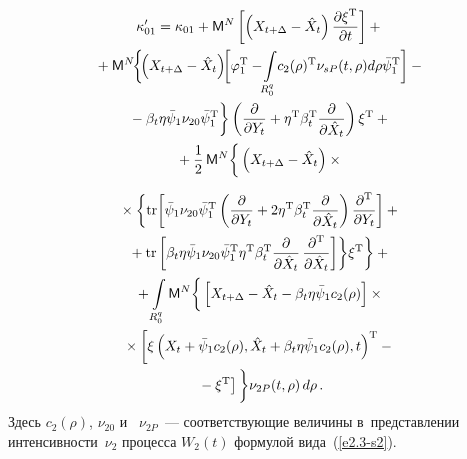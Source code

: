 \begin{multicols}{2}
\vspace*{-6pt}

\noindent
\begin{multline*}
\kappa_{01}' = \kappa_{01} + {\sf M}^N\left[ \left(X_{t+\Delta}- \hat X_t\right) 
\displaystyle\frac{\displaystyle \partial \xi^{\mathrm{T}}\mathstrut}{\displaystyle \partial t\mathstrut}\right] +{}\\
{}+ {\sf M}^N\!\bigg\{\! \!\left(X_{t+\Delta}-\hat X_t\right)\!\! \bigg[ 
\varphi_1^{\mathrm{T}} -\!\int\limits_{R_0^q}\! c_2(\rho)^{\mathrm{T}}
    \nu_{sP} (t,\rho) d\rho \bar\psi_1^{\mathrm{T}}\bigg] - {}\\
    {}-
    \beta_t\eta\bar\psi_1\nu_{20}\bar\psi_1^{\mathrm{T}}\bigg\}
\left(\displaystyle\frac{\displaystyle \partial\mathstrut}{\displaystyle \partial Y_t\mathstrut} + \eta^{\mathrm{T}} \beta_t^{\mathrm{T}} 
\displaystyle\frac{\displaystyle \partial\mathstrut}{\displaystyle \partial \hat X_t\mathstrut}\right)\xi^{\mathrm{T}}+{}\\
{}+
    \displaystyle\frac{\displaystyle 1\mathstrut}{\displaystyle 2\mathstrut}\, {\sf M}^N \bigg\{ 
    \left(X_{t+\Delta} - \hat X_t\right) \times{}
    \end{multline*}


\noindent
\begin{multline}
 {}\times
    \biggl\{ 
    \mathrm{tr}\biggl[ 
    \bar\psi_1 \nu_{20} \bar\psi_1^{\mathrm{T}} \left(
\fr{\partial }{\partial Y_t} + 2\eta^{\mathrm{T}} \beta_t^{\mathrm{T}} 
\fr{\partial}{\partial\hat X_t}\right)
    \fr{\partial^{\mathrm{T}}}{\partial Y_t}\biggr] +{}\\
       {}+
    \mathrm{tr}\left[ \beta_t \eta \bar\psi_1 \nu_{20} \bar\psi_1^{\mathrm{T}} 
    \eta^{\mathrm{T}}\beta_t^{\mathrm{T}}
    \fr{\partial}{\partial \hat X_t} \,
    \fr{\partial^{\mathrm{T}}}{\partial \hat X_t}\right]\biggr\}
    \xi^{\mathrm{T}}\biggr\}+{}\\
{}+\iii_{R_0^q} \mm^N \bigg\{
\vphantom{\left[ \xi \left(X_t+\bar\psi_1 c_2(\rho), \hat X_t +
\beta_t \eta \bar\psi_1 c_2 (\rho),t\right)^{\mathrm{T}} -
    \xi^{\mathrm{T}}\right]} 
\left[ X_{t+\Delta} - \hat X_t-\beta_t\eta\bar\psi_1 c_2(\rho)\right]\times{}\\
{}\times\left[ \xi \left(X_t+\bar\psi_1 c_2(\rho), \hat X_t +
\beta_t \eta \bar\psi_1 c_2 (\rho),t\right)^{\mathrm{T}} -{}\right.\\
\left.{}-
    \xi^{\mathrm{T}}\right]\bigg\} \nu_{2P}(t,\rho)\, d\rho\,.
    \label{e7.7-s2}
    \end{multline}
Здесь  $c_2 (\rho)$, $\nu_{20}$ и~ $\nu_{2P}$~--- соответствующие
величины в~представлении интенсивности~$\nu_2$ процесса  $W_2(t)$
формулой вида~(\ref{e2.3-s2}).


\end{multicols}
